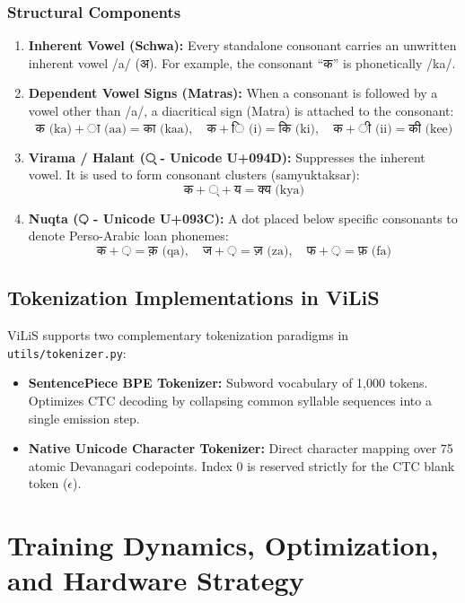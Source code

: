 \documentclass[11pt,a4paper]{report}
\begin{document}
\subsection{Structural Components}
\begin{enumerate}
    \item \textbf{Inherent Vowel (Schwa):} Every standalone consonant carries an unwritten inherent vowel /a/ (अ). For example, the consonant ``क'' is phonetically /ka/.
    \item \textbf{Dependent Vowel Signs (Matras):} When a consonant is followed by a vowel other than /a/, a diacritical sign (Matra) is attached to the consonant:
    $$\text{क (ka)} + \text{ा (aa)} = \text{का (kaa)}, \quad \text{क} + \text{ि (i)} = \text{कि (ki)}, \quad \text{क} + \text{ी (ii)} = \text{की (kee)}$$
    \item \textbf{Virama / Halant (् - Unicode U+094D):} Suppresses the inherent vowel. It is used to form consonant clusters (samyuktaksar):
    $$\text{क} + \text{्} + \text{य} = \text{क्य (kya)}$$
    \item \textbf{Nuqta (़ - Unicode U+093C):} A dot placed below specific consonants to denote Perso-Arabic loan phonemes:
    $$\text{क} + \text{़} = \text{क़ (qa)}, \quad \text{ज} + \text{़} = \text{ज़ (za)}, \quad \text{फ} + \text{़} = \text{फ़ (fa)}$$
\end{enumerate}

\section{Tokenization Implementations in ViLiS}
ViLiS supports two complementary tokenization paradigms in \texttt{utils/tokenizer.py}:
\begin{itemize}
    \item \textbf{SentencePiece BPE Tokenizer:} Subword vocabulary of 1,000 tokens. Optimizes CTC decoding by collapsing common syllable sequences into a single emission step.
    \item \textbf{Native Unicode Character Tokenizer:} Direct character mapping over 75 atomic Devanagari codepoints. Index 0 is reserved strictly for the CTC blank token ($\epsilon$).
\end{itemize}

\chapter{Training Dynamics, Optimization, and Hardware Strategy}
\end{document}
